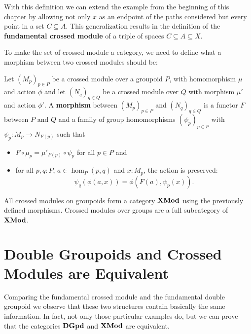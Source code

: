 With this definition we can extend the example from the beginning of this
chapter by allowing not only $x$ as an endpoint of the paths considered but every
point in a set $C \subseteq A$.
This generalization results in the definition of the \textbf{fundamental crossed
module} of a triple of spaces $C \subseteq A \subseteq X$.

To make the set of crossed module a category, we need to define what a morphism
between two crossed modules should be:

\begin{defn}
Let $(M_p)_{p \in P}$ be a crossed module over a groupoid $P$, with homomorphism
$\mu$ and action $\phi$ and let $(N_q)_{q \in Q}$ be a crossed module over $Q$
with morphism $\mu'$ and action $\phi'$.
A \textbf{morphism} between $(M_p)_{p \in P}$ and $(N_q)_{q \in Q}$ is a functor $F$
between $P$ and $Q$ and a family of group homomorphisms $(\psi_p)_{p \in P}$ 
with $\psi_p : M_p \to N_{F(p)}$ such that %
\begin{itemize}
\item $F \circ \mu_p = \mu'_{F(p)} \circ \psi_p$ for all $p \in P$ and
\item for all $p, q : P$, $a \in \hom_P(p,q)$ and $x : M_p$, the action is preserved:
\begin{equation*}
\psi_q(\phi(a,x)) = \phi(F(a),\psi_p(x)) \text{.} %
\end{equation*}
\end{itemize}
\end{defn}

\begin{defn}
All crossed modules on groupoids form a category $\mathbf{XMod}$ using the previously
defined morphisms. Crossed modules over groups are a full subcategory of $\mathbf{XMod}$.
\end{defn}

\section{Double Groupoids and Crossed Modules are Equivalent}

Comparing the fundamental crossed module and the fundamental double groupoid we
observe that these two structures contain basically the same information.
In fact, not only those particular examples do, but we can prove that the categories
$\mathbf{DGpd}$ and $\mathbf{XMod}$ are equivalent.

